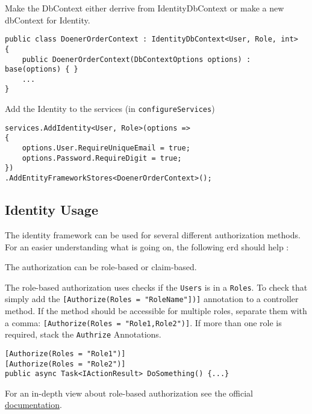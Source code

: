 \documentclass[12pt, a4paper]{article}
\begin{document}
\noindent Make the DbContext either derrive from IdentityDbContext or make a new dbContext for Identity.

\begin{lstlisting}
public class DoenerOrderContext : IdentityDbContext<User, Role, int>
{
	public DoenerOrderContext(DbContextOptions options) : base(options) { }
	...
}
\end{lstlisting}

\noindent Add the Identity to the services (in \lstinline|configureServices|)

\begin{lstlisting}
services.AddIdentity<User, Role>(options =>
{
	options.User.RequireUniqueEmail = true;
	options.Password.RequireDigit = true;
})
.AddEntityFrameworkStores<DoenerOrderContext>();
\end{lstlisting}

\subsection{Identity Usage}
The identity framework can be used for several different authorization methods. 
For an easier understanding what is going on, the following erd should help : 


\noindent The authorization can be role-based or claim-based. 

The role-based authorization uses checks if the \lstinline|Users| is in a \lstinline|Roles|. To check that simply add the \lstinline|[Authorize(Roles = "RoleName"])]| annotation to a controller method. If the method should be accessible for multiple roles, separate them with a comma: \lstinline|[Authorize(Roles = "Role1,Role2")]|. If more than one role is required, stack the \lstinline|Authrize| Annotations.
\begin{lstlisting}
[Authorize(Roles = "Role1")]
[Authorize(Roles = "Role2")]
public async Task<IActionResult> DoSomething() {...}
\end{lstlisting}
 For an in-depth view about role-based authorization see the official  \href{https://docs.microsoft.com/en-us/aspnet/core/security/authorization/roles}{documentation}.
 
\end{document}
